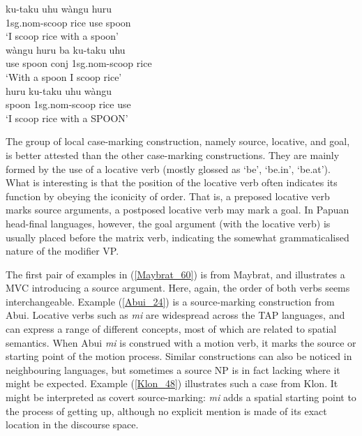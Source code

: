 \pex 
\a \label{Kambera_22a}
\gll ku-taku uhu wàngu huru \\
1\acs{sg}.\acs{nom}-scoop rice use spoon \\
\glft `I scoop rice with a spoon' \\ 
\z
\a \label{Kambera_22b}
\gll wàngu huru ba ku-taku uhu \\
use spoon \acs{conj} 1\acs{sg}.\acs{nom}-scoop rice \\
\glft `With a spoon I scoop rice' \\ 
\z
\a \label{Kambera_22c}
\gll huru ku-taku uhu wàngu \\ 
spoon 1\acs{sg}.\acs{nom}-scoop rice use \\
\glft `I scoop rice with a SPOON' \\ 
\z
\xe

The group of local case-marking construction, namely source, locative, and goal, is better attested than the other case-marking constructions. They are mainly formed by the use of a locative verb (mostly glossed as `be', `be.in', `be.at'). What is interesting is that the position of the locative verb often indicates its function by obeying the iconicity of order. That is, a preposed locative verb marks source arguments, a postposed locative verb may mark a goal. In Papuan head-final languages, however, the goal argument (with the locative verb) is usually placed before the matrix verb, indicating the somewhat grammaticalised nature of the modifier VP.

The first pair of examples in (\ref{Maybrat_60}) is from Maybrat, and illustrates a MVC introducing a source argument. Here, again, the order of both verbs seems interchangeable. Example (\ref{Abui_24}) is a source-marking construction from Abui. Locative verbs such as \textit{mi} are widespread across the TAP languages, and can express a range of different concepts, most of which are related to spatial semantics. When Abui \textit{mi} is construed with a motion verb, it marks the source or starting point of the motion process. Similar constructions can also be noticed in neighbouring languages, but sometimes a source NP is in fact lacking where it might be expected. Example (\ref{Klon_48}) illustrates such a case from Klon. It might be interpreted as covert source-marking: \textit{mi} adds a spatial starting point to the process of getting up, although no explicit mention is made of its exact location in the discourse space.

